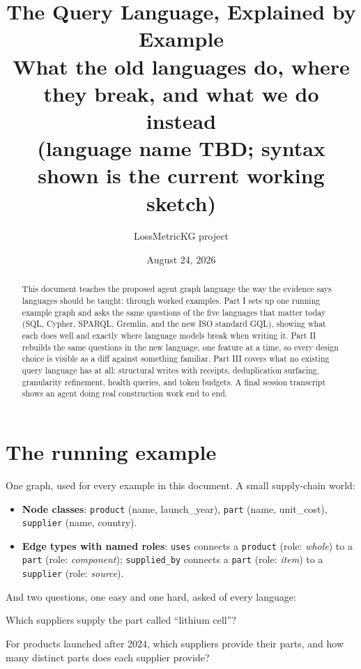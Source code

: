 \documentclass[11pt]{article}
\title{\textbf{The Query Language, Explained by Example}\\[6pt]
\large What the old languages do, where they break, and what we do instead\\[2pt]
\normalsize (language name TBD; syntax shown is the current working sketch)}
\author{LossMetricKG project}
\date{August 24, 2026}
\begin{document}
\maketitle

\begin{abstract}
\noindent This document teaches the proposed agent graph language the way the evidence says languages should be taught: through worked examples. Part I sets up one running example graph and asks the same questions of the five languages that matter today (SQL, Cypher, SPARQL, Gremlin, and the new ISO standard GQL), showing what each does well and exactly where language models break when writing it. Part II rebuilds the same questions in the new language, one feature at a time, so every design choice is visible as a diff against something familiar. Part III covers what no existing query language has at all: structural writes with receipts, deduplication surfacing, granularity refinement, health queries, and token budgets. A final session transcript shows an agent doing real construction work end to end.
\end{abstract}

\tableofcontents
\newpage

\section{The running example}

One graph, used for every example in this document. A small supply-chain world:

\begin{itemize}[leftmargin=1.4em,itemsep=1pt]
  \item \textbf{Node classes}: \texttt{product} (name, launch\_year), \texttt{part} (name, unit\_cost), \texttt{supplier} (name, country).
  \item \textbf{Edge types with named roles}: \texttt{uses} connects a \texttt{product} (role: \emph{whole}) to a \texttt{part} (role: \emph{component}); \texttt{supplied\_by} connects a \texttt{part} (role: \emph{item}) to a \texttt{supplier} (role: \emph{source}).
\end{itemize}

And two questions, one easy and one hard, asked of every language:

\begin{description}[leftmargin=1.4em,itemsep=2pt]
  \item[Q1 (one hop):] Which suppliers supply the part called ``lithium cell''?
  \item[Q2 (multi-hop + aggregation):] For products launched after 2024, which suppliers provide their parts, and how many distinct parts does each supplier provide?
\end{description}
\end{document}
